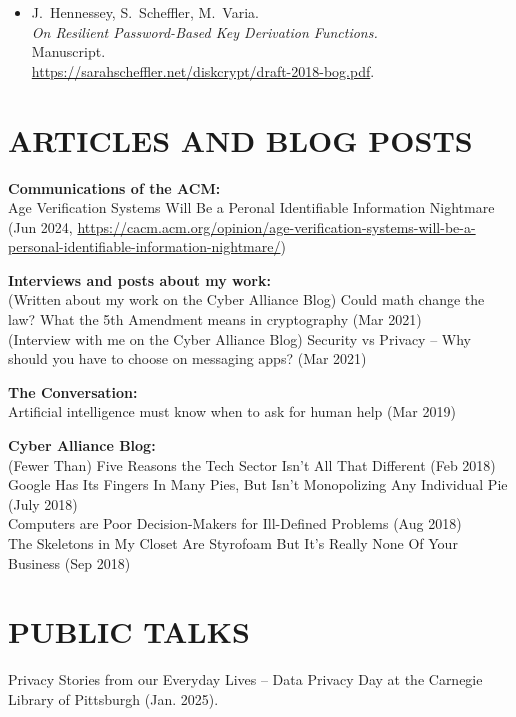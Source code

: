 \documentclass{res}
\begin{document}
\begin{resume}
\begin{itemize}
\item[\bog] J.~Hennessey, S.~Scheffler, M.~Varia. \\
\emph{On Resilient Password-Based Key Derivation Functions.} \\
Manuscript.  \\
\url{https://sarahscheffler.net/diskcrypt/draft-2018-bog.pdf}.
\end{itemize}




\section{ARTICLES AND BLOG POSTS}  
\vspace{0.1in}

\textbf{Communications of the ACM:} \\
    Age Verification Systems Will Be a Peronal Identifiable Information Nightmare (Jun 2024, \url{https://cacm.acm.org/opinion/age-verification-systems-will-be-a-personal-identifiable-information-nightmare/})

\textbf{Interviews and posts about my work:} \\
    (Written about my work on the Cyber Alliance Blog) Could math change the law? What the 5th Amendment means in cryptography (Mar 2021) \\
    (Interview with me on the Cyber Alliance Blog) Security vs Privacy -- Why should you have to choose on messaging apps? (Mar 2021)

\textbf{The Conversation:} \\         
    Artificial intelligence must know when to ask for human help (Mar 2019) 

\textbf{Cyber Alliance Blog:} \\         
    (Fewer Than) Five Reasons the Tech Sector Isn't All That Different (Feb 2018) \\
    Google Has Its Fingers In Many Pies, But Isn't Monopolizing Any Individual Pie (July 2018) \\
    Computers are Poor Decision-Makers for Ill-Defined Problems (Aug 2018) \\
    The Skeletons in My Closet Are Styrofoam But It's Really None Of Your Business (Sep 2018) 


\section{PUBLIC TALKS}  
\vspace{0.1in}
Privacy Stories from our Everyday Lives -- Data Privacy Day at the Carnegie Library of Pittsburgh (Jan. 2025). \\



\end{resume}
\end{document}
